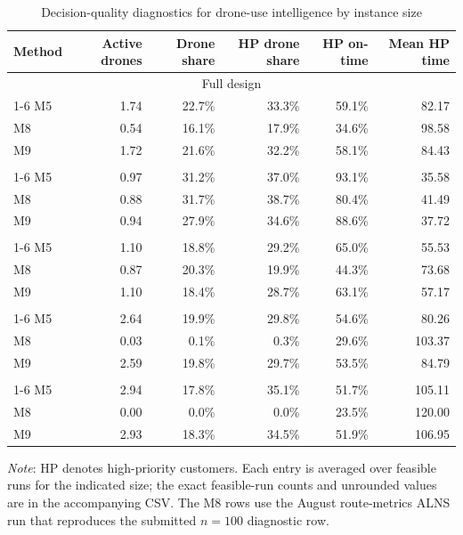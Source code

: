 \begin{table}[htbp]
\centering
\caption{Decision-quality diagnostics for drone-use intelligence by instance size}
\label{tab:smart_drone_use_quality_by_size}
\footnotesize
\begin{tabular}{lrrrrr}
\toprule
Method & Active drones & Drone share & HP drone share & HP on-time & Mean HP time \\
\midrule
\multicolumn{6}{c}{Full design} \\
\cmidrule(lr){1-6}
M5 & 1.74 & 22.7\% & 33.3\% & 59.1\% & 82.17 \\
M8 & 0.54 & 16.1\% & 17.9\% & 34.6\% & 98.58 \\
M9 & 1.72 & 21.6\% & 32.2\% & 58.1\% & 84.43 \\
\addlinespace
\multicolumn{6}{c}{$n=15$} \\
\cmidrule(lr){1-6}
M5 & 0.97 & 31.2\% & 37.0\% & 93.1\% & 35.58 \\
M8 & 0.88 & 31.7\% & 38.7\% & 80.4\% & 41.49 \\
M9 & 0.94 & 27.9\% & 34.6\% & 88.6\% & 37.72 \\
\addlinespace
\multicolumn{6}{c}{$n=50$} \\
\cmidrule(lr){1-6}
M5 & 1.10 & 18.8\% & 29.2\% & 65.0\% & 55.53 \\
M8 & 0.87 & 20.3\% & 19.9\% & 44.3\% & 73.68 \\
M9 & 1.10 & 18.4\% & 28.7\% & 63.1\% & 57.17 \\
\addlinespace
\multicolumn{6}{c}{$n=75$} \\
\cmidrule(lr){1-6}
M5 & 2.64 & 19.9\% & 29.8\% & 54.6\% & 80.26 \\
M8 & 0.03 & 0.1\% & 0.3\% & 29.6\% & 103.37 \\
M9 & 2.59 & 19.8\% & 29.7\% & 53.5\% & 84.79 \\
\addlinespace
\multicolumn{6}{c}{$n=100$} \\
\cmidrule(lr){1-6}
M5 & 2.94 & 17.8\% & 35.1\% & 51.7\% & 105.11 \\
M8 & 0.00 & 0.0\% & 0.0\% & 23.5\% & 120.00 \\
M9 & 2.93 & 18.3\% & 34.5\% & 51.9\% & 106.95 \\
\bottomrule
\end{tabular}
\begin{flushleft}
\footnotesize
\textit{Note}: HP denotes high-priority customers. Each entry is averaged over feasible runs for the indicated size; the exact feasible-run counts and unrounded values are in the accompanying CSV. The M8 rows use the August route-metrics ALNS run that reproduces the submitted $n=100$ diagnostic row.
\end{flushleft}
\end{table}
